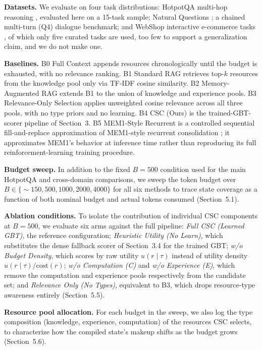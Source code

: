 \documentclass{article}
\begin{document}
\textbf{Datasets.} We evaluate on four task distributions: HotpotQA multi-hop reasoning \citep{yang2018hotpotqa}, evaluated here on a 15-task sample; Natural Questions \citep{kwiatkowski2019naturalquestions}; a chained multi-turn (Q4) dialogue benchmark; and WebShop interactive e-commerce tasks \citep{yao2022webshop}, of which only five curated tasks are used, too few to support a generalization claim, and we do not make one.

\textbf{Baselines.} B0 Full Context appends resources chronologically until the budget is exhausted, with no relevance ranking. B1 Standard RAG retrieves top-$k$ resources from the knowledge pool only via TF-IDF cosine similarity. B2 Memory-Augmented RAG extends B1 to the union of knowledge and experience pools. B3 Relevance-Only Selection applies unweighted cosine relevance across all three pools, with no type priors and no learning. B4 CSC (Ours) is the trained-GBT-scorer pipeline of Section~3. B5 MEM1-Style Recurrent is a controlled sequential fill-and-replace approximation of MEM1-style recurrent consolidation \citep{zhou2025mem1}; it approximates MEM1's behavior at inference time rather than reproducing its full reinforcement-learning training procedure.

\textbf{Budget sweep.} In addition to the fixed $B=500$ condition used for the main HotpotQA and cross-domain comparisons, we sweep the token budget over $B \in \{\sim\!150, 500, 1000, 2000, 4000\}$ for all six methods to trace state coverage as a function of both nominal budget and actual tokens consumed (Section~5.1).

\textbf{Ablation conditions.} To isolate the contribution of individual CSC components at $B=500$, we evaluate six arms against the full pipeline: \textit{Full CSC (Learned GBT)}, the reference configuration; \textit{Heuristic Utility (No Learn)}, which substitutes the dense fallback scorer of Section~3.4 for the trained GBT; \textit{w/o Budget Density}, which scores by raw utility $u(r\mid\tau)$ instead of utility density $u(r\mid\tau)/\text{cost}(r)$; \textit{w/o Computation (C)} and \textit{w/o Experience (E)}, which remove the computation and experience pools respectively from the candidate set; and \textit{Relevance Only (No Types)}, equivalent to B3, which drops resource-type awareness entirely (Section~5.5).

\textbf{Resource pool allocation.} For each budget in the sweep, we also log the type composition (knowledge, experience, computation) of the resources CSC selects, to characterize how the compiled state's makeup shifts as the budget grows (Section~5.6).
\end{document}
